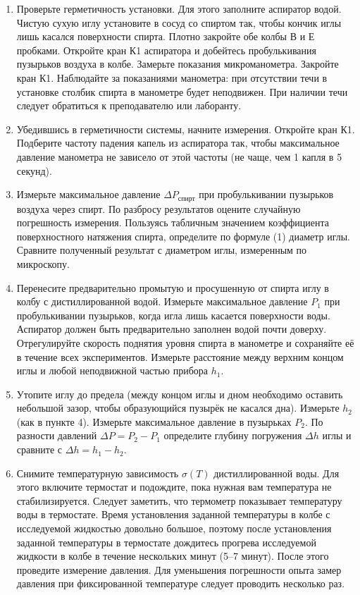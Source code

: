 \documentclass[a4paper]{article}
\begin{document}
	\begin{enumerate}
		\item Проверьте герметичность установки. Для этого заполните аспиратор водой. Чистую сухую иглу установите в сосуд со спиртом так, чтобы кончик иглы лишь касался поверхности спирта. Плотно закройте обе колбы В и Е пробками. Откройте кран К1 аспиратора и добейтесь пробулькивания пузырьков воздуха в колбе. Замерьте показания микроманометра. Закройте кран К1. Наблюдайте за показаниями манометра: при отсутствии течи в установке столбик спирта в манометре будет неподвижен. При наличии течи следует обратиться к преподавателю или лаборанту.
		
		\item Убедившись в герметичности системы, начните измерения. Откройте кран К1. Подберите частоту падения капель из аспиратора так, чтобы максимальное давление манометра не зависело от этой частоты (не чаще, чем 1 капля в 5 секунд).
		
		\item Измерьте максимальное давление \(\Delta P_{\text{спирт}}\) при пробулькивании пузырьков воздуха через спирт. По разбросу результатов оцените случайную погрешность измерения. Пользуясь табличным значением коэффициента поверхностного натяжения спирта, определите по формуле (1) диаметр иглы. Сравните полученный результат с диаметром иглы, измеренным по микроскопу.
		
		\item Перенесите предварительно промытую и просушенную от спирта иглу в колбу с дистиллированной водой. Измерьте максимальное давление \(P_1\) при пробулькивании пузырьков, когда игла лишь касается поверхности воды. Аспиратор должен быть предварительно заполнен водой почти доверху. Отрегулируйте скорость поднятия уровня спирта в манометре и сохраняйте её в течение всех экспериментов. Измерьте расстояние между верхним концом иглы и любой неподвижной частью прибора \(h_1\).
		
		\item Утопите иглу до предела (между концом иглы и дном необходимо оставить небольшой зазор, чтобы образующийся пузырёк не касался дна). Измерьте \(h_2\) (как в пункте 4). Измерьте максимальное давление в пузырьках \(P_2\). По разности давлений \(\Delta P = P_2 - P_1\) определите глубину погружения \(\Delta h\) иглы и сравните с \(\Delta h = h_1 - h_2\).
		
		\item Снимите температурную зависимость \(\sigma(T)\) дистиллированной воды. Для этого включите термостат и подождите, пока нужная вам температура не стабилизируется. Следует заметить, что термометр показывает температуру воды в термостате. Время установления заданной температуры в колбе с исследуемой жидкостью довольно большое, поэтому после установления заданной температуры в термостате дождитесь прогрева исследуемой жидкости в колбе в течение нескольких минут (5–7 минут). После этого проведите измерение давления. Для уменьшения погрешности опыта замер давления при фиксированной температуре следует проводить несколько раз.
		

\end{enumerate}
\end{document}
